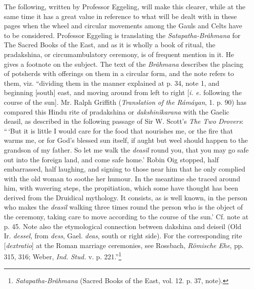 \documentclass[a4paper, 11pt, oneside, polutonikogreek, english]{article}
\begin{document}
The following, written by Professor Eggeling, will make this clearer, while at the same time it has a great value in reference to what will be dealt with in these pages when the wheel and circular movements among the Gauls and Celts have to be considered. Professor Eggeling is translating the \emph{Satapatha-Brâhmana} for The Sacred Books of the East, and as it is wholly a book of ritual, the pradakshina, or circumambulatory ceremony, is of frequent mention in it. He gives a footnote on the subject. The text of the \emph{Brâhmana} describes the placing of potsherds with offerings on them in a circular form, and the note refers to them, viz. ``dividing them in the manner explained at p. 34, note 1, and beginning [south] east, and moving around from left to right [\emph{i. e.} following the course of the sun]. Mr. Ralph Griffith (\emph{Translation of the Rámáyan}, 1. p. 90) has compared this Hindu rite of pradakshina or \emph{dakshinîkarana} with the Gaelic deasil, as described in the following passage of Sir W. Scott's \emph{The Two Drovers}: ``\,`But it is little I would care for the food that nourishes me, or the fire that warms me, or for God's blessed sun itself, if aught but weel should happen to the grandson of my father. So let me walk the \emph{deasil} round you, that you may go safe out into the foreign land, and come safe home.' Robin Oig stopped, half embarrassed, half laughing, and signing to those near him that he only complied with the old woman to soothe her humour. In the meantime she traced around him, with wavering steps, the propitiation, which some have thought has been derived from the Druidical mythology. It consists, as is well known, in the person who makes the \emph{deasil} walking three times round the person who is the object of the ceremony, taking care to move according to the course of the sun.' Cf. note at p. 45. Note also the etymological connection between dakshina and deiseil (Old Ir. \emph{dessel}, from \emph{dess}, Gael. \emph{deas}, south or right side). For the corresponding rite [\emph{dextratio}] at the Roman marriage ceremonies, see Rossbach, \emph{Römische Ehe}, pp. 315, 316; Weber, \emph{Ind. Stud.} v. p. 221.''\footnote{\emph{Satapatha-Brâhmana} (Sacred Books of the East, vol. 12. p. 37, note).}
\end{document}
